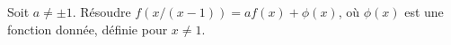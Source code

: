Soit $a \neq \pm 1$. Résoudre $f(x/(x - 1)) = af(x) + \phi(x)$, où $\phi(x)$ est une fonction donnée, définie pour $x \neq 1$.
